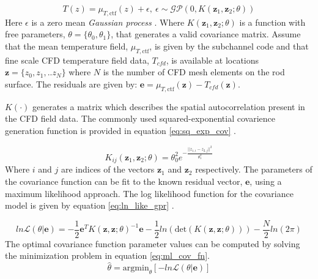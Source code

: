 \begin{equation}
T(z) = \mu_{T, \mathrm{ctf}}(z) + \epsilon,\ \epsilon \sim \mathcal {GP}(0, K(\mathbf z_1, \mathbf z_2;\theta))
\label{eq:simple_krig_ab}
\end{equation}
Here $\epsilon$ is a zero mean \emph{Gaussian process}  \cite{rasmussen2004gaussian}.
Where $K(\mathbf z_1, \mathbf z_2;\theta)$ is a function  with free parameters, $\theta=\{\theta_0,\theta_1\}$, that generates a valid covariance matrix.  Assume that the mean temperature field, $\mu_{T, \mathrm{ctf}}$, is given by the subchannel code and that fine scale CFD temperature field data, $T_{cfd}$, is available at locations $\mathbf z = \{z_0, z_1, .. z_N\}$ where $N$ is the number of CFD mesh elements on the rod surface.  The residuals are given by: $\mathbf e = \mu_{T, \mathrm{ctf}}(\mathbf z) - T_{cfd}(\mathbf z)$.  

$K(\cdot)$ generates a matrix which describes the spatial autocorrelation present in the CFD field data.  The commonly used squared-exponential covarience generation function is provided in equation \ref{eq:sq_exp_cov} \cite{rasmussen2004gaussian}.

\begin{equation}
K_{ij}(\mathbf z_1, \mathbf z_2;\theta) = \theta_0^2 e^{- \frac{||z_{1,i} - z_{2,j}||^2}{\theta_1^2}}
\label{eq:sq_exp_cov}
\end{equation}
Where $i$ and $j$ are indices of the vectors $\mathbf z_1$ and $\mathbf z_2$ respectively.
The parameters of the covariance function can be fit to the known residual vector, $\mathbf e$, using a maximum likelihood approach. 
The log likelihood function for the covariance model is given by equation \ref{eq:ln_like_gpr} \cite{snelson2006tutorial}.

%

\begin{equation}
ln \mathcal L(\theta|\mathbf e) = -\frac{1}{2} \mathbf e^T K(\mathbf z, \mathbf z; \theta)^{-1} \mathbf e - \frac{1}{2} ln (\mathrm{det}(K(\mathbf z, \mathbf z; \theta))) - \frac{N}{2}ln(2\pi)
\label{eq:ln_like_gpr}
\end{equation}
The optimal covariance function parameter values can be computed by solving the minimization problem in equation \ref{eq:ml_cov_fn}.
\begin{equation}
\hat \theta = \mathrm{argmin}_{\theta}[ -ln \mathcal L(\theta| \mathbf e)]
\label{eq:ml_cov_fn}
\end{equation}

